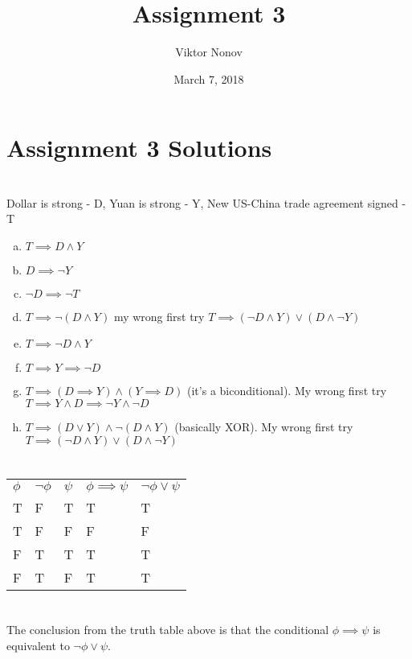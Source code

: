 \documentclass{article}
\title{Assignment 3}
\author{Viktor Nonov}
\date{March 7, 2018}
\begin{document}
\section*{Assignment 3 Solutions}

\section{}
Dollar is strong - D, Yuan is strong - Y, New US-China trade agreement signed - T

\begin{enumerate}[a.]
\item $T \implies D \wedge Y$
\item $D \implies \neg Y$
\item $\neg D \implies \neg T$
\item $T \implies \neg (D \wedge Y)$  my wrong first try $T \implies (\neg D \wedge Y) \vee (D \wedge \neg Y)$
\item $T \implies \neg D \wedge Y$
\item $T \implies Y \implies \neg D$
\item $T \implies (D \implies Y) \wedge (Y \implies D)$ (it's a biconditional). My wrong first try $T \implies Y \wedge D \implies \neg Y \wedge \neg D$
\item $T \implies (D \vee Y) \wedge \neg (D \wedge Y)$ (basically XOR). My wrong first try $T \implies (\neg D \wedge Y) \vee (D \wedge \neg Y)$
\end{enumerate}

\section{}
\begin{tabular}{ l l l l l }
  $\phi$ & $\neg \phi$ & $\psi$ & $\phi \implies \psi$ & $\neg \phi \vee \psi$ \\
  T      & F           & T      & T                       & T                     \\
  T      & F           & F      & F                       & F                     \\
  F      & T           & T      & T                       & T                     \\
  F      & T           & F      & T                       & T                     \\
\end{tabular}

\section{}
The conclusion from the truth table above is that the conditional $\phi \implies \psi$ is equivalent to $\neg \phi \vee \psi$.
\end{document}
